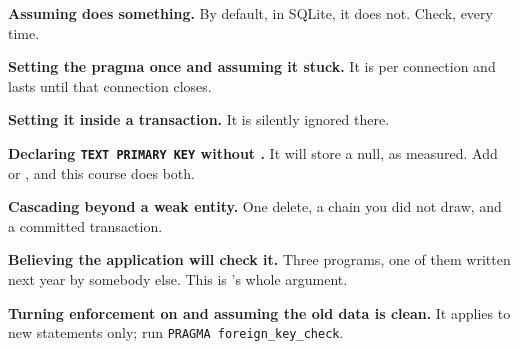 \begin{pitfall}
\begin{tight}
  \item \textbf{Assuming  does something.} By default, in
        SQLite, it does not. Check, every time.
  \item \textbf{Setting the pragma once and assuming it stuck.} It is per
        connection and lasts until that connection closes.
  \item \textbf{Setting it inside a transaction.} It is silently ignored there.
  \item \textbf{Declaring \texttt{TEXT PRIMARY KEY} without .}
        It will store a null, as measured. Add  or
        , and this course does both.
  \item \textbf{Cascading beyond a weak entity.} One delete, a chain you did
        not draw, and a committed transaction.
  \item \textbf{Believing the application will check it.} Three programs, one
        of them written next year by somebody else. This is
        's whole argument.
  \item \textbf{Turning enforcement on and assuming the old data is clean.} It
        applies to new statements only; run
        \texttt{PRAGMA foreign\_key\_check}.
\end{tight}
\end{pitfall}

